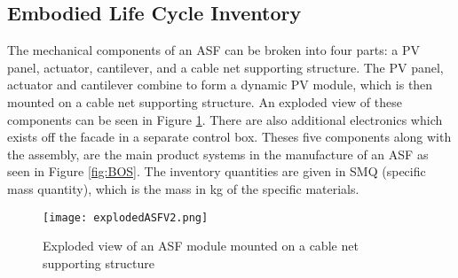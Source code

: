 \subsection{Embodied Life Cycle Inventory}
\label{ch:meth:Embodied}



The mechanical components of an ASF can be broken into four parts: a PV panel, actuator, cantilever, and a cable net supporting structure. The PV panel, actuator and cantilever combine to form a dynamic PV module, which is then mounted on a cable net supporting structure. An exploded view of these components can be seen in Figure \ref{fig:explodedView}. There are also additional electronics which exists off the facade in a separate control box. Theses five components along with the assembly, are the main product systems in the manufacture of an ASF as seen in Figure \ref{fig:BOS}. The inventory quantities are given in SMQ (specific mass quantity), which is the mass in kg of the specific materials.




\begin{figure}[H]
\begin{center}
\texttt{[image: explodedASFV2.png]}
\caption{Exploded view of an ASF module mounted on a cable net supporting structure}
\label{fig:explodedView}
\end{center}
\end{figure}

